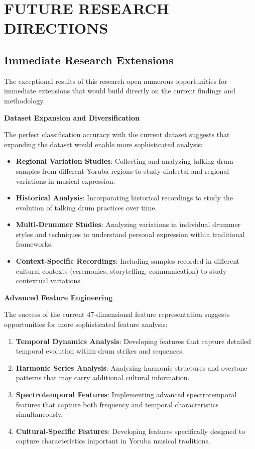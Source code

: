 \documentclass[12pt,a4paper]{article}
\begin{document}
\section{FUTURE RESEARCH DIRECTIONS}

\subsection{Immediate Research Extensions}

The exceptional results of this research open numerous opportunities for immediate extensions that would build directly on the current findings and methodology.

\textbf{Dataset Expansion and Diversification}

The perfect classification accuracy with the current dataset suggests that expanding the dataset would enable more sophisticated analysis:

\begin{itemize}
\item \textbf{Regional Variation Studies}: Collecting and analyzing talking drum samples from different Yoruba regions to study dialectal and regional variations in musical expression.
\item \textbf{Historical Analysis}: Incorporating historical recordings to study the evolution of talking drum practices over time.
\item \textbf{Multi-Drummer Studies}: Analyzing variations in individual drummer styles and techniques to understand personal expression within traditional frameworks.
\item \textbf{Context-Specific Recordings}: Including samples recorded in different cultural contexts (ceremonies, storytelling, communication) to study contextual variations.
\end{itemize}

\textbf{Advanced Feature Engineering}

The success of the current 47-dimensional feature representation suggests opportunities for more sophisticated feature analysis:

\begin{enumerate}
\item \textbf{Temporal Dynamics Analysis}: Developing features that capture detailed temporal evolution within drum strikes and sequences.
\item \textbf{Harmonic Series Analysis}: Analyzing harmonic structures and overtone patterns that may carry additional cultural information.
\item \textbf{Spectrotemporal Features}: Implementing advanced spectrotemporal features that capture both frequency and temporal characteristics simultaneously.
\item \textbf{Cultural-Specific Features}: Developing features specifically designed to capture characteristics important in Yoruba musical traditions.
\end{enumerate}
\end{document}
